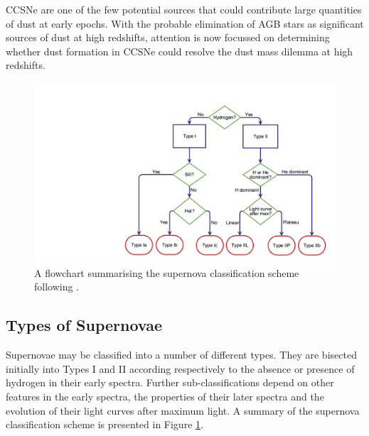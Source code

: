 CCSNe are one of the few potential sources that could contribute large quantities of dust at early epochs.  With the probable elimination of  AGB stars as  significant sources of dust at high redshifts, attention is now focussed on determining whether dust formation in CCSNe could resolve the dust mass dilemma  at high redshifts.

\begin{figure}
\centering
\includegraphics[clip=true, scale = 0.2, trim= 930 50 55 210]{chapters/chapter1/figs/sn_classification.png}
\caption{A flowchart summarising the supernova classification scheme following \citet{Turatto2003}.}
\label{intro:fig:sn_class}
\end{figure}

\subsection{Types of Supernovae}

Supernovae may be classified into a number of different types.  They are bisected initially into Types I and II according respectively to the absence or presence of hydrogen in their early spectra.  Further sub-classifications depend on  other features in the early spectra, the properties of their later spectra and the evolution of their  light curves after maximum light.  A summary of the supernova classification scheme is presented in Figure \ref{intro:fig:sn_class}.  



